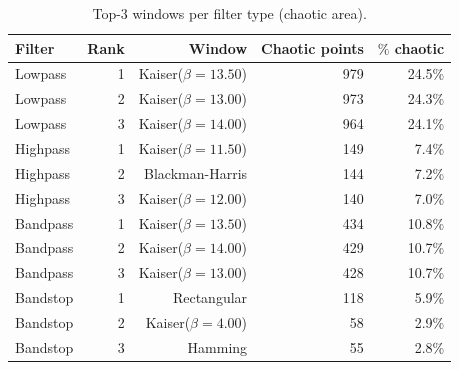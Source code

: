 \begin{table}[htbp]
  \centering
  \caption{Top-3 windows per filter type (chaotic area).}
  \begin{tabular}{lrrrr}
    \toprule
    Filter & Rank & Window & Chaotic points & $\%$ chaotic \\
    \midrule
    Lowpass & 1 & Kaiser($\beta=13.50$) & 979 & 24.5\% \\
    Lowpass & 2 & Kaiser($\beta=13.00$) & 973 & 24.3\% \\
    Lowpass & 3 & Kaiser($\beta=14.00$) & 964 & 24.1\% \\
    Highpass & 1 & Kaiser($\beta=11.50$) & 149 & 7.4\% \\
    Highpass & 2 & Blackman-Harris & 144 & 7.2\% \\
    Highpass & 3 & Kaiser($\beta=12.00$) & 140 & 7.0\% \\
    Bandpass & 1 & Kaiser($\beta=13.50$) & 434 & 10.8\% \\
    Bandpass & 2 & Kaiser($\beta=14.00$) & 429 & 10.7\% \\
    Bandpass & 3 & Kaiser($\beta=13.00$) & 428 & 10.7\% \\
    Bandstop & 1 & Rectangular & 118 & 5.9\% \\
    Bandstop & 2 & Kaiser($\beta=4.00$) & 58 & 2.9\% \\
    Bandstop & 3 & Hamming & 55 & 2.8\% \\
    \bottomrule
  \end{tabular}
\end{table}
